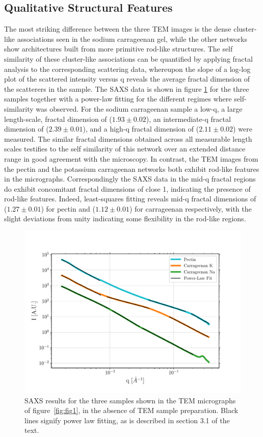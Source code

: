 \subsection{Qualitative Structural Features}
The most striking difference between the three TEM images is the dense cluster-like associations seen in the sodium carrageenan gel, while the other networks show architectures built from more primitive rod-like structures. The self similarity of these cluster-like associations can be quantified by applying fractal analysis to the corresponding scattering data, whereupon the slope of a log-log plot of the scattered intensity versus q reveals the average fractal dimension of the scatterers in the sample. The SAXS data is shown in figure \ref{fig:SAXS} for the three samples together with a power-law fitting for the different regimes where self-similarity was observed. For the sodium carrageenan sample a low-q, a large length-scale, fractal dimension of ($1.93 \pm 0.02$), an intermediate-q fractal dimension of ($2.39 \pm 0.01$), and a high-q fractal dimension of ($2.11 \pm 0.02$) were measured. The similar fractal dimensions obtained across all measurable length scales testifies to the self similarity of this network over an extended distance range in good agreement with the microscopy. In contrast, the TEM images from the pectin and the potassium carrageenan networks both exhibit rod-like features in the micrographs. Correspondingly the SAXS data in the mid-q fractal regions do exhibit concomitant fractal dimensions of close 1, indicating the presence of rod-like features. Indeed, least-squares fitting reveals mid-q fractal dimensions of  ($1.27 \pm 0.01$) for pectin and ($1.12 \pm 0.01$) for carrageenan respectively, with the slight deviations from unity indicating some flexibility in the rod-like regions.    

\begin{figure}[H]
    \centering
    \noindent\includegraphics[width=0.75\linewidth]{Figures/chapter-temsaxs/saxs_fit.pdf}
    \caption{SAXS results for the three samples shown in the TEM micrographs of figure~\ref{fig:fig1}, in the absence of TEM sample preparation. Black lines signify power law fitting, as is described in section 3.1 of the text.}\label{fig:SAXS}
\end{figure}

